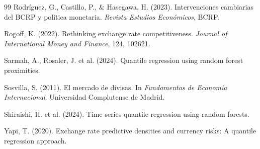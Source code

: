 ﻿\documentclass[11pt,a4paper]{article}
\begin{document}
\begin{thebibliography}{99}
Rodríguez, G., Castillo, P., \& Hasegawa, H. (2023). Intervenciones cambiarias del BCRP y política monetaria. \textit{Revista Estudios Económicos}, BCRP.

Rogoff, K. (2022). Rethinking exchange rate competitiveness. \textit{Journal of International Money and Finance}, 124, 102621.

Sarmah, A., Rosaler, J. et al. (2024). Quantile regression using random forest proximities. %

Sosvilla, S. (2011). El mercado de divisas. In \textit{Fundamentos de Economía Internacional}. Universidad Complutense de Madrid.

Shiraishi, H. et al. (2024). Time series quantile regression using random forests. %

Yapi, T. (2020). Exchange rate predictive densities and currency risks: A quantile regression approach. %



\end{thebibliography}
\end{document}
